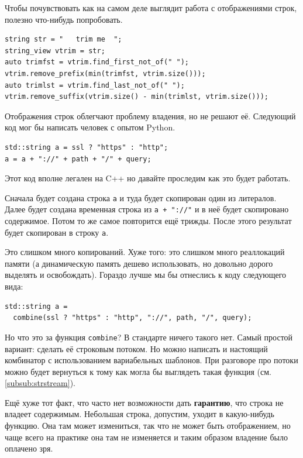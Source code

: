 \documentclass[a4paper,12pt,oneside]{book}
\begin{document}
Чтобы почувствовать как на самом деле выглядит работа с отображениями строк, полезно что-нибудь попробовать.

\begin{lstlisting}
string str = "   trim me  ";
string_view vtrim = str;
auto trimfst = vtrim.find_first_not_of(" ");
vtrim.remove_prefix(min(trimfst, vtrim.size()));
auto trimlst = vtrim.find_last_not_of(" ");
vtrim.remove_suffix(vtrim.size() - min(trimlst, vtrim.size()));
\end{lstlisting}

Отображения строк облегчают проблему владения, но не решают её. Следующий код мог бы написать человек с опытом Python.

\begin{lstlisting}
std::string a = ssl ? "https" : "http";
a = a + "://" + path + "/" + query;
\end{lstlisting}

Этот код вполне легален на C++ но давайте проследим как это будет работать.

Сначала будет создана строка \lstinline!a! и туда будет скопирован один из литералов. Далее будет создана временная строка из \lstinline!a + "://"! и в неё будет скопировано содержимое. Потом то же самое повторится ещё трижды. После этого результат будет скопирован в строку \lstinline!a!.

Это слишком много копирований. Хуже того: это слишком много реаллокаций памяти (а динамическую память дешево использовать, но довольно дорого выделять и освобождать). Гораздо лучше мы бы отнеслись к коду следующего вида:

\begin{lstlisting}
std::string a = 
  combine(ssl ? "https" : "http", "://", path, "/", query);
\end{lstlisting}

Но что это за функция \lstinline!combine!? В стандарте ничего такого нет. Самый простой вариант: сделать её строковым потоком. Но можно написать и настоящий комбинатор с использованием вариабельных шаблонов. При разговоре про потоки можно будет вернуться к тому как могла бы выглядеть такая функция (см. \ref{subsub:strstream}).

Ещё хуже тот факт, что часто нет возможности дать \textbf{гарантию}, что строка не владеет содержимым. Небольшая строка, допустим, уходит в какую-нибудь функцию. Она там может измениться, так что не может быть отображением, но чаще всего на практике она там не изменяется и таким образом владение было оплачено зря.
\end{document}
